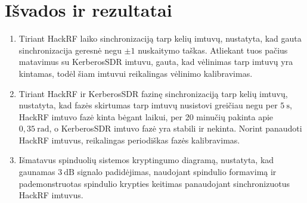 \documentclass[../gnss_interference_resistant_thesis.tex]{subfiles}
\begin{document}
\section*{Išvados ir rezultatai}

\begin{enumerate}
    \item Tiriant HackRF laiko sinchronizaciją tarp kelių imtuvų, nustatyta, kad gauta sinchronizacija
          geresnė negu $\pm 1$ nuskaitymo taškas. Atliekant tuos pačius matavimus su KerberosSDR imtuvu,
          gauta, kad vėlinimas tarp imtuvų yra kintamas, todėl šiam imtuvui reikalingas vėlinimo kalibravimas.
    \item Tiriant HackRF ir KerberosSDR fazinę sinchronizaciją tarp kelių imtuvų, nustatyta, kad fazės skirtumas
          tarp imtuvų nusistovi greičiau negu per $5\ \mathrm{s}$, HackRF imtuvo fazė kinta bėgant laikui, per
          20 minučių pakinta apie $0,35\ \mathrm{rad}$, o KerberosSDR imtuvo fazė yra stabili ir nekinta.
          Norint panaudoti HackRF imtuvus, reikalingas periodiškas fazės kalibravimas.
    \item Išmatavus spinduolių sistemos kryptingumo diagramą, nustatyta, kad gaunamas $3\ \mathrm{dB}$
          signalo padidėjimas, naudojant spindulio formavimą ir pademonstruotas spindulio krypties keitimas
          panaudojant sinchronizuotus HackRF imtuvus.
\end{enumerate}
\end{document}
